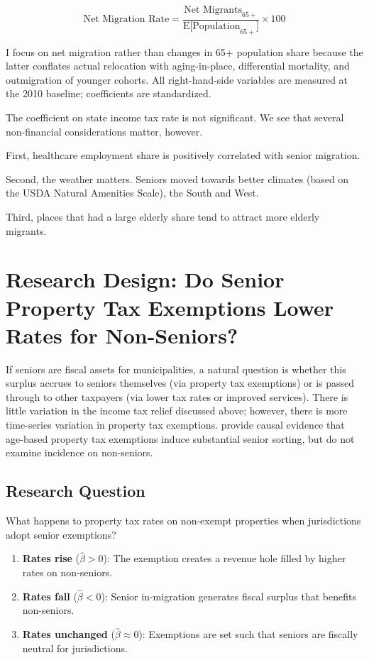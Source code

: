 \documentclass[11pt]{article}
\begin{document}
{\small
\[
\text{Net Migration Rate} = \frac{\text{Net Migrants}_{65+}}{\text{E[Population}_{65+}]} \times 100
\]}

I focus on net migration rather than changes in 65+ population share because the latter conflates actual relocation with aging-in-place, differential mortality, and outmigration of younger cohorts. All right-hand-side variables are measured at the 2010 baseline; coefficients are standardized. 


The coefficient on state income tax rate is not significant. We see that several non-financial considerations matter, however. 

First, healthcare employment share is positively correlated with senior migration. 


Second, the weather matters. Seniors moved towards better climates (based on the USDA Natural Amenities Scale), the South and West.

Third, places that had a large elderly share tend to attract more elderly migrants.



\newpage




\section{Research Design: Do Senior Property Tax Exemptions Lower Rates for Non-Seniors?}

If seniors are fiscal assets for municipalities, a natural question is whether this surplus accrues to seniors themselves (via property tax exemptions) or is passed through to other taxpayers (via lower tax rates or improved services). There is little variation in the income tax relief discussed above; however, there is more time-series variation in property tax exemptions. \citet{banzhaf2021age} provide causal evidence that age-based property tax exemptions induce substantial senior sorting, but do not examine incidence on non-seniors.

\subsection{Research Question}
What happens to property tax rates on non-exempt properties when jurisdictions adopt senior exemptions? 
\begin{enumerate}
    \item \textbf{Rates rise} ($\hat{\beta} > 0$): The exemption creates a revenue hole filled by higher rates on non-seniors. 
    \item \textbf{Rates fall} ($\hat{\beta} < 0$): Senior in-migration generates fiscal surplus that benefits non-seniors.
    \item \textbf{Rates unchanged} ($\hat{\beta} \approx 0$): Exemptions are set such that seniors are fiscally neutral for jurisdictions. 
\end{enumerate}
\end{document}
